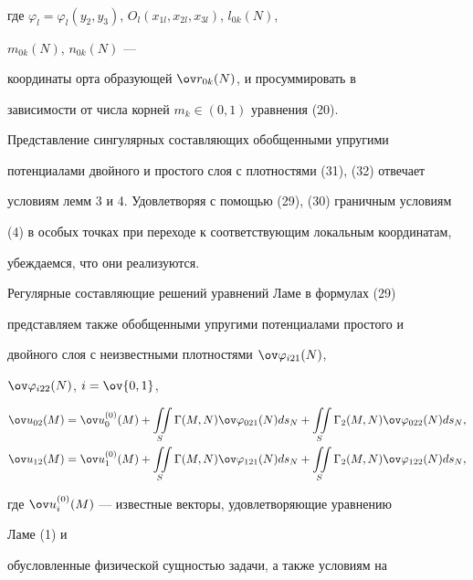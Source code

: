 \begin{pf}
\begin{gather*}
\end{gather*} 


где $\varphi_l=\varphi_l(y_2,y_3)$, $O_l(x_{1l},x_{2l},x_{3l})$, $l_{0k}(N)$, 


$m_{0k}(N)$, $n_{0k}(N)$ ---  


координаты орта образующей $\ov r_{0k}(N)$, и просуммировать в  


зависимости от числа корней $m_k\in(0,1)$ уравнения (20). 


 


Представление сингулярных составляющих обобщенными упругими  


потенциалами двойного и простого слоя с плотностями (31), (32) отвечает  


условиям лемм 3 и 4. Удовлетворяя с помощью (29), (30) граничным условиям  


(4) в особых точках при переходе к соответствующим локальным координатам,  


убеждаемся, что они реализуются.  


 


Регулярные составляющие решений уравнений Ламе в формулах (29)  


представляем также обобщенными упругими потенциалами простого и  


двойного слоя с неизвестными плотностями $\ov\varphi_{i21}(N)$, 


$\ov\varphi_{i22}(N)$, $i=\ov{0,1}$, 


\begin{align} 


\ov u_{02}(M)&=\ov u{}^{(0)}_0(M)+\iint\limits_S\Gamma(M,N) 


\ov\varphi_{021}(N)ds_N+\iint\limits_S\Gamma_2(M,N) 


\ov\varphi_{022}(N)ds_N,\\ 


% 


\ov u_{12}(M)&=\ov u{}^{(0)}_1(M)+\iint\limits_S\Gamma(M,N) 


\ov\varphi_{121}(N)ds_N+\iint\limits_S\Gamma_2(M,N) 


\ov\varphi_{122}(N)ds_N,


\end{align} 


где $\ov u{}^{(0)}_i(M)$ --- известные векторы, удовлетворяющие уравнению 


Ламе (1) и  


обусловленные физической сущностью задачи, а также условиям на  



\end{pf}
